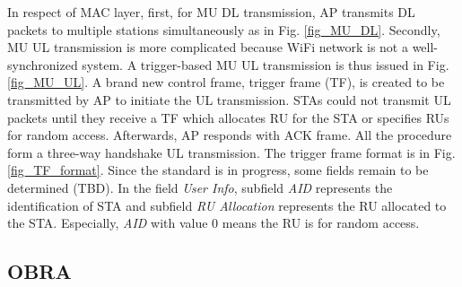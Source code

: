 \documentclass[journal]{IEEEtran}
\begin{document}
In respect of MAC layer, first, for MU DL transmission, AP transmits DL packets to multiple stations simultaneously as in Fig. \ref{fig_MU_DL}.
Secondly, MU UL transmission is more complicated because WiFi network is not a well-synchronized system. 
A trigger-based MU UL transmission is thus issued in Fig. \ref{fig_MU_UL}.
A brand new control frame, trigger frame (TF), is created to be transmitted by AP to initiate the UL transmission.
STAs could not transmit UL packets until they receive a TF which allocates RU for the STA or specifies RUs for random access. 
Afterwards, AP responds with ACK frame. All the procedure form a three-way handshake UL transmission. 
The trigger frame format is in Fig. \ref{fig_TF_format}. 
Since the standard is in progress, some fields remain to be determined (TBD). 
In the field \textit{User Info}, subfield \textit{AID} represents the identification of STA and subfield \textit{RU Allocation} represents the RU allocated to the STA.
Especially, \textit{AID} with value 0 means the RU is for random access.







\subsection{OBRA}		\label{sec_RA_illu}


\end{document}
